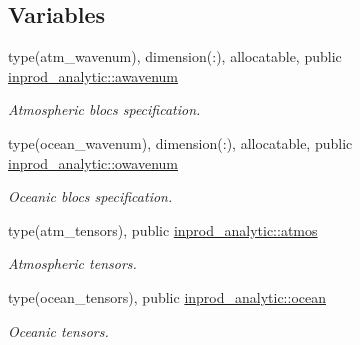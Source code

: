 \subsection*{Variables}
\begin{DoxyCompactItemize}
\item 
type(atm\+\_\+wavenum), dimension(\+:), allocatable, public \hyperlink{namespaceinprod__analytic_aa6b6ebedac44495720ffe649bc937a56}{inprod\+\_\+analytic\+::awavenum}
\begin{DoxyCompactList}\small\item\em Atmospheric blocs specification. \end{DoxyCompactList}\item 
type(ocean\+\_\+wavenum), dimension(\+:), allocatable, public \hyperlink{namespaceinprod__analytic_a7273713c6b1a079e1c653e8b8d2fe089}{inprod\+\_\+analytic\+::owavenum}
\begin{DoxyCompactList}\small\item\em Oceanic blocs specification. \end{DoxyCompactList}\item 
type(atm\+\_\+tensors), public \hyperlink{namespaceinprod__analytic_a6f4fe9aa292d78b871e5498e411d1297}{inprod\+\_\+analytic\+::atmos}
\begin{DoxyCompactList}\small\item\em Atmospheric tensors. \end{DoxyCompactList}\item 
type(ocean\+\_\+tensors), public \hyperlink{namespaceinprod__analytic_ac691a1258fb0a341e2ba5b4811be1c0b}{inprod\+\_\+analytic\+::ocean}
\begin{DoxyCompactList}\small\item\em Oceanic tensors. \end{DoxyCompactList}\end{DoxyCompactItemize}

